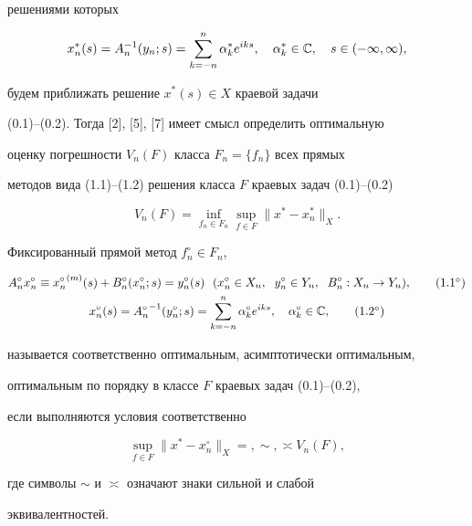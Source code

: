 решениями которых 


\begin{equation}


x_n^*(s) = A_n^{-1}(y_n;s) = \suml_{k=-n}^n\alpha_k^*e^{iks},\quad


\alpha_k^*\in \bC,\quad s\in (-\infty,\infty),


\end{equation}


будем приближать решение $x^*(s)\in X$ краевой задачи


(0.1)--(0.2). Тогда [2], [5], [7] имеет смысл определить оптимальную


оценку погрешности $V_n(F)$ класса $F_n =\{f_n\}$ всех прямых


методов вида (1.1)--(1.2) решения класса $F$ краевых задач (0.1)--(0.2)


\begin{equation}


V_n(F) = \inf\limits_{f_n\in F_n}\sup_{f\in F}\|x^* - x^*_n\|_X.


\end{equation}





\begin{defnnonum}


Фиксированный прямой метод $f_n^\circ \in F_n$,


\begin{gather}


A_n^\circ x_n^\circ \equiv


{x_n^\circ}^{(m)}(s)+B_n^\circ(x_n^\circ;s) =y_n^\circ(s)\ \


(x_n^\circ\in X_n,\ \; y_n^\circ\in Y_n,\ \; B_n^\circ:X_n\to Y_n),


\tag{$1.1^\circ$} \\


%


x_n^\circ(s) = {A_n^\circ}^{-1}(y_n^\circ;s) = \suml_{k=-n}^n


\alpha_k^\circ e^{iks},\quad \alpha_k^\circ \in \bC,


\tag{$1.2^\circ$}


\end{gather}


называется соответственно оптимальным, асимптотически оптимальным,


оптимальным по порядку в классе $F$ краевых задач (0.1)--(0.2),


если выполняются условия соответственно


\begin{equation}


\sup_{f\in F}\|x^* - x_n^\circ\|_X = , \sim, \asymp V_n(F),


\end{equation}


где символы $\sim$  и $\asymp$  означают знаки сильной и слабой


эквивалентностей.


\end{defnnonum}





